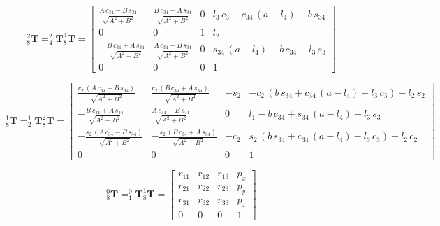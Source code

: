 \documentclass{homework}
\begin{document}
\begin{sol}
\[
  _8^2\mathbf{T} = _4^2\mathbf{T} _8^4\mathbf{T} =
  \begin{bmatrix} 
\frac{A\,c_{34}-B\,s_{34}}{\sqrt{A^2+B^2}} & \frac{B\,c_{34}+A\,s_{34}}{\sqrt{A^2+B^2}} & 0 & l_{3}\,c_{3}-c_{34}\,\left(a-l_{4}\right)-b\,s_{34} \\ 
0 & 0 & 1 & l_{2} \\ 
-\frac{B\,c_{34}+A\,s_{34}}{\sqrt{A^2+B^2}} & \frac{A\,c_{34}-B\,s_{34}}{\sqrt{A^2+B^2}} & 0 & s_{34}\,\left(a-l_{4}\right)-b\,c_{34}-l_{3}\,s_{3} \\ 
0 & 0 & 0 & 1
\end{bmatrix}
\]

\[
  _8^1\mathbf{T} = _2^1\mathbf{T} _8^2\mathbf{T} =
  \begin{bmatrix} 
\frac{c_{2}\,\left(A\,c_{34}-B\,s_{34}\right)}{\sqrt{A^2+B^2}} & \frac{c_{2}\,\left(B\,c_{34}+A\,s_{34}\right)}{\sqrt{A^2+B^2}} & -s_{2} & -c_{2}\,\left(b\,s_{34}+c_{34}\,\left(a-l_{4}\right)-l_{3}\,c_{3}\right)-l_{2}\,s_{2} \\ 
-\frac{B\,c_{34}+A\,s_{34}}{\sqrt{A^2+B^2}} & \frac{A\,c_{34}-B\,s_{34}}{\sqrt{A^2+B^2}} & 0 & l_{1}-b\,c_{34}+s_{34}\,\left(a-l_{4}\right)-l_{3}\,s_{3} \\ 
-\frac{s_{2}\,\left(A\,c_{34}-B\,s_{34}\right)}{\sqrt{A^2+B^2}} & -\frac{s_{2}\,\left(B\,c_{34}+A\,s_{34}\right)}{\sqrt{A^2+B^2}} & -c_{2} & s_{2}\,\left(b\,s_{34}+c_{34}\,\left(a-l_{4}\right)-l_{3}\,c_{3}\right)-l_{2}\,c_{2} \\ 
0 & 0 & 0 & 1
\end{bmatrix}
\]

\[
  _8^0\mathbf{T} = _1^0\mathbf{T} _8^1\mathbf{T} =
  \begin{bmatrix} 
r_{11} & r_{12} & r_{13} & p_x \\ 
r_{21} & r_{22} & r_{23} & p_y \\ 
r_{31} & r_{32} & r_{33} & p_z \\ 
0 & 0 & 0 & 1
\end{bmatrix}
\] 


\end{sol}
\end{document}
